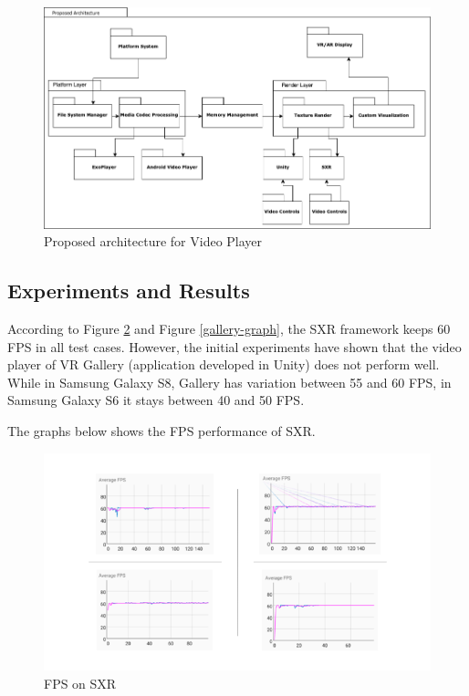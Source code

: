 \documentclass[runningheads]{llncs}
\begin{document}
\begin{figure}[h!]
    \centerline{\includegraphics[scale=0.5]{images/ProposedArch.png}}
    \caption{Proposed architecture for Video Player}
    \label{fig-video-player-arch}
\end{figure}

\subsection{Experiments and Results}


According to Figure \ref{SXR-graph} and Figure \ref{gallery-graph}, the SXR framework keeps 60 FPS in all test cases. However, the initial experiments have shown that the video player of VR Gallery (application developed in Unity) does not perform well. While in Samsung Galaxy S8, Gallery has variation between 55 and 60 FPS, in Samsung Galaxy S6 it stays between 40 and 50 FPS.

The graphs below shows the FPS performance of SXR.

\begin{figure}[!h]
    \centerline{\includegraphics[scale=0.45]{images/SXR.png}}
    \caption{FPS on SXR}
    \label{SXR-graph}
\end{figure}
\end{document}
